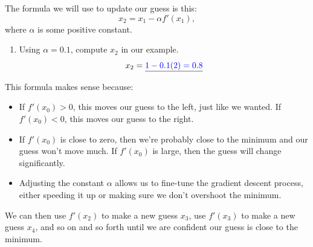 \documentclass[11pt]{article}
\begin{document}
The formula we will use to update our guess is this:
\[
    x_2 = x_1 - \alpha f'(x_1),
\]
where $\alpha$ is some positive constant.
\begin{enumerate}
    \item[2.]  Using $\alpha = 0.1$, compute $x_2$ in our example.
    \[
        x_2 = \underline{{\color{blue}1 - 0.1(2) = 0.8}}
    \]
\end{enumerate}
\newpage
This formula makes sense because:
\begin{itemize}
    \item If $f'(x_0)>0$, this moves our guess to the left, just like we wanted. If $f'(x_0) < 0$, this moves our guess to the right.
    \item If $f'(x_0)$ is close to zero, then we're probably close to the minimum and our guess won't move much. If $f'(x_0)$ is large, then the guess will change significantly.
    \item Adjusting the constant $\alpha$ allows us to fine-tune the gradient descent process, either speeding it up or making sure we don't overshoot the minimum.
\end{itemize}
We can then use $f'(x_2)$ to make a new guess $x_3$, use $f'(x_3)$ to make a new guess $x_4$, and so on and so forth until we are confident our guess is close to the minimum.
\end{document}
